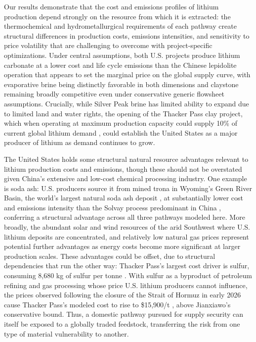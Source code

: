 \documentclass{article}
\renewcommand\_{\textunderscore\allowbreak}
\begin{document}
Our results demonstrate that the cost and emissions profiles of lithium production depend strongly on the resource from which it is extracted: the thermochemical and hydrometallurgical requirements of each pathway create structural differences in production costs, emissions intensities, and sensitivity to price volatility that are challenging to overcome with project-specific optimizations. Under central assumptions, both U.S. projects produce lithium carbonate at a lower cost and life cycle emissions than the Chinese lepidolite operation that appears to set the marginal price on the global supply curve, with evaporative brine being distinctly favorable in both dimensions and claystone remaining broadly competitive even under conservative generic flowsheet assumptions. Crucially, while Silver Peak brine has limited ability to expand due to limited land and water rights, the opening of the Thacker Pass clay project, which when operating at maximum production capacity could supply 10\% of current global lithium demand \cite{usgeologicalsurveyMineralCommoditySummaries2026}, could establish the United States as a major producer of lithium as demand continues to grow. 

The United States holds some structural natural resource advantages relevant to lithium production costs and emissions, though these should not be overstated given China's extensive and low-cost chemical processing industry. One example is soda ash: U.S. producers source it from mined trona in Wyoming's Green River Basin, the world's largest natural soda ash deposit \cite{usgeologicalsurveyMineralCommoditySummaries2026}, at substantially lower cost and emissions intensity than the Solvay process predominant in China \cite{wangGreenhouseGasesRegulated2024, scottCanSyntheticSoda2023, royLithiumClayAssessing2024}, conferring a structural advantage across all three pathways modeled here. More broadly, the abundant solar and wind resources of the arid Southwest where U.S. lithium deposits are concentrated, and relatively low natural gas prices represent potential further advantages as energy costs become more significant at larger production scales. These advantages could be offset, due to structural dependencies that run the other way: Thacker Pass's largest cost driver is sulfur, consuming 8,680 kg of sulfur per tonne . With sulfur as a byproduct of petroleum refining and gas processing whose price U.S. lithium producers cannot influence, the prices observed following the closure of the Strait of Hormuz in early 2026 cause Thacker Pass's modeled cost to rise to \$15,900/t ,
above Jianxiawo's conservative bound. Thus, a domestic pathway pursued for supply security can itself be exposed to a globally traded feedstock, transferring the risk from one type of material vulnerability to another.
\end{document}

